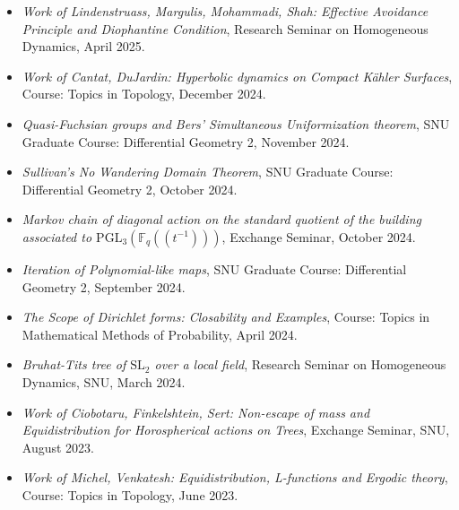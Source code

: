 \documentclass[9pt]{developercv} %
\begin{document}
\vspace{-10 pt}
\begin{itemize}
    \item \textit{Work of Lindenstruass, Margulis, Mohammadi, Shah: Effective Avoidance Principle and Diophantine Condition}, Research Seminar on Homogeneous Dynamics, April 2025.
	\item \textit{Work of Cantat, DuJardin: Hyperbolic dynamics on Compact K\"ahler Surfaces}, Course: Topics in Topology, December 2024.
	\item \textit{Quasi-Fuchsian groups and Bers' Simultaneous Uniformization theorem}, SNU Graduate Course: Differential Geometry 2, November 2024.
	\item \textit{Sullivan's No Wandering Domain Theorem}, SNU Graduate Course: Differential Geometry 2, October 2024.
	\item \textit{Markov chain of diagonal action on the standard quotient of the building associated to $\mathrm{PGL}_3\left(\mathbb{F}_q(\!(t^{-1})\!)\right)$}, Exchange Seminar, October 2024.
	\item \textit{Iteration of Polynomial-like maps}, SNU Graduate Course: Differential Geometry 2, September 2024.
	\item \textit{The Scope of Dirichlet forms: Closability and Examples}, Course: Topics in Mathematical Methods of Probability, April 2024.
	\item \textit{Bruhat-Tits tree of $\mathrm{SL}_2$ over a local field}, Research Seminar on Homogeneous Dynamics, SNU, March 2024.
	\item \textit{Work of Ciobotaru, Finkelshtein, Sert: Non-escape of mass and Equidistribution for Horospherical actions on Trees}, Exchange Seminar, SNU, August 2023.
	\item \textit{Work of Michel, Venkatesh: Equidistribution, L-functions and Ergodic theory}, Course: Topics in Topology, June 2023.
\end{itemize}


\vspace{-10 pt}
\begin{entrylist}
\end{entrylist}
\end{document}
